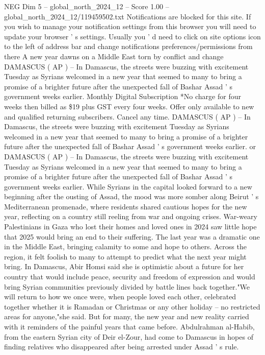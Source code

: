 \begin{textsample}{NEG Dim 5 – global\_north\_2024\_12 – Score 1.00 – global\_north\_2024\_12/119459502.txt}  \label{ex:f5_neg_356}
Notifications are blocked for this site.
If you wish to manage your notification settings from this browser you will need to update your browser ' s settings.
Usually you ' d need to click on site options icon to the left of address bar and change notifications preferences/permissions from there A new year dawns on a Middle East torn by conflict and change DAMASCUS ( AP ) -- In Damascus, the streets were buzzing with excitement Tuesday as Syrians welcomed in a new year that seemed to many to bring a promise of a brighter future after the unexpected fall of Bashar Assad ' s government weeks earlier.
Monthly Digital Subscription *No charge for four weeks then billed as \$19 plus GST every four weeks.
Offer only available to new and qualified returning subscribers.
Cancel any time.
DAMASCUS ( AP ) -- In Damascus, the streets were buzzing with excitement Tuesday as Syrians welcomed in a new year that seemed to many to bring a promise of a brighter future after the unexpected fall of Bashar Assad ' s government weeks earlier. or DAMASCUS ( AP ) -- In Damascus, the streets were buzzing with excitement Tuesday as Syrians welcomed in a new year that seemed to many to bring a promise of a brighter future after the unexpected fall of Bashar Assad ' s government weeks earlier.
While Syrians in the capital looked forward to a new beginning after the ousting of Assad, the mood was more somber along Beirut ' s Mediterranean promenade, where residents shared cautious hopes for the new year, reflecting on a country still reeling from war and ongoing crises.
War-weary Palestinians in Gaza who lost their homes and loved ones in 2024 saw little hope that 2025 would bring an end to their suffering.
The last year was a dramatic one in the Middle East, bringing calamity to some and hope to others.
Across the region, it felt foolish to many to attempt to predict what the next year might bring.
In Damascus, Abir Homsi said she is optimistic about a future for her country that would include peace, security and freedom of expression and would bring Syrian communities previously divided by battle lines back together."We will return to how we once were, when people loved each other, celebrated together whether it is Ramadan or Christmas or any other holiday -- no restricted areas for anyone,"she said.
But for many, the new year and new reality carried with it reminders of the painful years that came before.
Abdulrahman al-Habib, from the eastern Syrian city of Deir el-Zour, had come to Damascus in hopes of finding relatives who disappeared after being arrested under Assad ' s rule.

\end{textsample}
